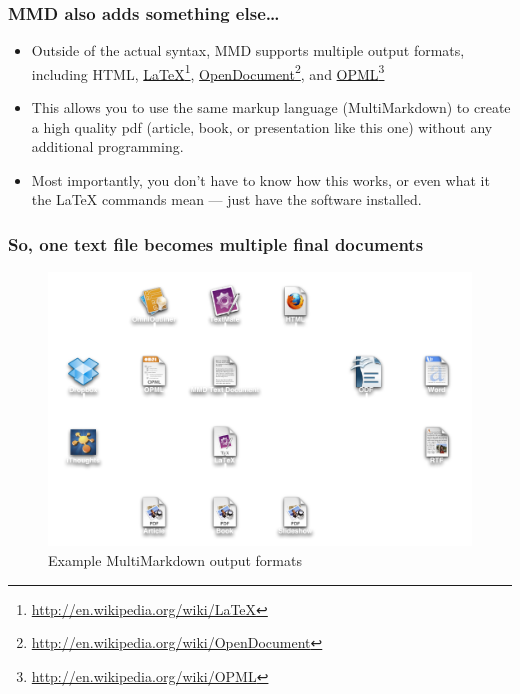 \begin{frame}

\frametitle{MMD also adds something else{\ldots}}
\label{mmdalsoaddssomethingelse}

\begin{itemize}
\item Outside of the actual syntax, MMD supports multiple output formats,
 including HTML, \href{http://en.wikipedia.org/wiki/LaTeX}{LaTeX}\footnote{\href{http://en.wikipedia.org/wiki/LaTeX}{http:/\slash en.wikipedia.org\slash wiki\slash LaTeX}},
 \href{http://en.wikipedia.org/wiki/OpenDocument}{OpenDocument}\footnote{\href{http://en.wikipedia.org/wiki/OpenDocument}{http:/\slash en.wikipedia.org\slash wiki\slash OpenDocument}}, and
 \href{http://en.wikipedia.org/wiki/OPML}{OPML}\footnote{\href{http://en.wikipedia.org/wiki/OPML}{http:/\slash en.wikipedia.org\slash wiki\slash OPML}}

\item This allows you to use the same markup language (MultiMarkdown) to create a
 high quality pdf (article, book, or presentation like this one) without any
 additional programming.

\item Most importantly, you don't have to know how this works, or even what it
 the LaTeX commands mean --- just have the software installed.

\end{itemize}

\end{frame}

\begin{frame}

\frametitle{So, one text file becomes multiple final documents}
\label{soonetextfilebecomesmultiplefinaldocuments}

\begin{figure}[htbp]
\centering
\includegraphics[keepaspectratio,width=\textwidth,height=0.75\textheight]{OPML-MMD-Map.pdf}
\caption{Example MultiMarkdown output formats}
\label{}
\end{figure}


\end{frame}


